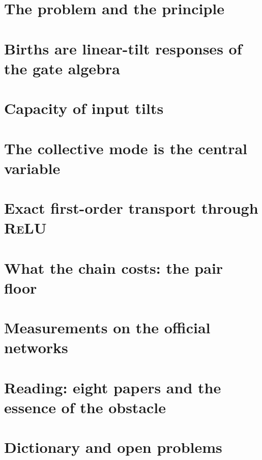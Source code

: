 \documentclass[11pt]{article}
\theoremstyle{plain}
\theoremstyle{definition}\newtheorem{definition}[theorem]{Definition}\newtheorem{remark}[theorem]{Remark}\newtheorem{example}[theorem]{Example}
\begin{document}
\section{The problem and the principle}

\section{Births are linear-tilt responses of the gate algebra}

\section{Capacity of input tilts}

\section{The collective mode is the central variable}

\section{Exact first-order transport through \textsc{ReLU}}

\section{What the chain costs: the pair floor}

\section{Measurements on the official networks}

\section{Reading: eight papers and the essence of the obstacle}

\section{Dictionary and open problems}

\appendix
\end{document}
